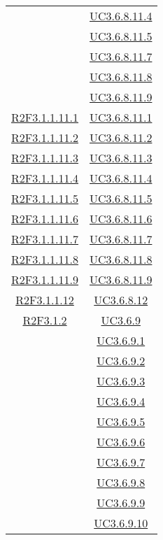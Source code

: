 \begin{longtable}{|c|c|}
& \hyperlink{UC3.6.8.11.4}{UC3.6.8.11.4}\\
& \hyperlink{UC3.6.8.11.5}{UC3.6.8.11.5}\\
& \hyperlink{UC3.6.8.11.7}{UC3.6.8.11.7}\\
& \hyperlink{UC3.6.8.11.8}{UC3.6.8.11.8}\\
& \hyperlink{UC3.6.8.11.9}{UC3.6.8.11.9}\\
\hline
\hyperlink{R2F3.1.1.11.1}{R2F3.1.1.11.1} & \hyperlink{UC3.6.8.11.1}{UC3.6.8.11.1}\\
\hline
\hyperlink{R2F3.1.1.11.2}{R2F3.1.1.11.2} & \hyperlink{UC3.6.8.11.2}{UC3.6.8.11.2}\\
\hline
\hyperlink{R2F3.1.1.11.3}{R2F3.1.1.11.3} & \hyperlink{UC3.6.8.11.3}{UC3.6.8.11.3}\\
\hline
\hyperlink{R2F3.1.1.11.4}{R2F3.1.1.11.4} & \hyperlink{UC3.6.8.11.4}{UC3.6.8.11.4}\\
\hline
\hyperlink{R2F3.1.1.11.5}{R2F3.1.1.11.5} & \hyperlink{UC3.6.8.11.5}{UC3.6.8.11.5}\\
\hline
\hyperlink{R2F3.1.1.11.6}{R2F3.1.1.11.6} & \hyperlink{UC3.6.8.11.6}{UC3.6.8.11.6}\\
\hline
\hyperlink{R2F3.1.1.11.7}{R2F3.1.1.11.7} & \hyperlink{UC3.6.8.11.7}{UC3.6.8.11.7}\\
\hline
\hyperlink{R2F3.1.1.11.8}{R2F3.1.1.11.8} & \hyperlink{UC3.6.8.11.8}{UC3.6.8.11.8}\\
\hline
\hyperlink{R2F3.1.1.11.9}{R2F3.1.1.11.9} & \hyperlink{UC3.6.8.11.9}{UC3.6.8.11.9}\\
\hline
\hyperlink{R2F3.1.1.12}{R2F3.1.1.12} & \hyperlink{UC3.6.8.12}{UC3.6.8.12}\\
\hline
\hyperlink{R2F3.1.2}{R2F3.1.2} & \hyperlink{UC3.6.9}{UC3.6.9}\\
& \hyperlink{UC3.6.9.1}{UC3.6.9.1}\\
& \hyperlink{UC3.6.9.2}{UC3.6.9.2}\\
& \hyperlink{UC3.6.9.3}{UC3.6.9.3}\\
& \hyperlink{UC3.6.9.4}{UC3.6.9.4}\\
& \hyperlink{UC3.6.9.5}{UC3.6.9.5}\\
& \hyperlink{UC3.6.9.6}{UC3.6.9.6}\\
& \hyperlink{UC3.6.9.7}{UC3.6.9.7}\\
& \hyperlink{UC3.6.9.8}{UC3.6.9.8}\\
& \hyperlink{UC3.6.9.9}{UC3.6.9.9}\\
& \hyperlink{UC3.6.9.10}{UC3.6.9.10}\\

\end{longtable}
